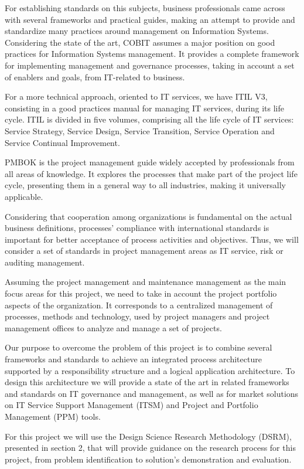 For establishing standards on this subjects, business professionals came across with several frameworks and practical guides, making an attempt to provide and standardize many practices around management on Information Systems. Considering the state of the art, COBIT assumes a major position on good practices for Information Systems management. It provides a complete framework for implementing management and governance processes, taking in account a set of enablers and goals, from IT-related to business.\par
For a more technical approach, oriented to IT services, we have ITIL V3, consisting in a good practices manual for managing IT services, during its life cycle. ITIL is divided in five volumes, comprising all the life cycle of IT services: Service Strategy, Service Design, Service Transition, Service Operation and Service Continual Improvement.\par
PMBOK is the project management guide widely accepted by professionals from all areas of knowledge. It explores the processes that make part of the project life cycle, presenting them in a general way to all industries, making it universally applicable.\par
Considering that cooperation among organizations is fundamental on the actual business definitions, processes' compliance with international standards is important for better acceptance of process activities and objectives. Thus, we will consider a set of standards in project management areas as IT service, risk or auditing management.\par   
Assuming the project management and maintenance management as the main focus areas for this project, we need to take in account the project portfolio aspects of the organization. It corresponds to a centralized management of processes, methods and technology, used by project managers and project management offices to analyze and manage a set of projects.\par
Our purpose to overcome the problem of this project is to combine several frameworks and standards to achieve an integrated process architecture supported by a responsibility structure and a logical application architecture. To design this architecture we will provide a state of the art in related frameworks and standards on IT governance and management, as well as for market solutions on IT Service Support Management (ITSM) and Project and Portfolio Management (PPM) tools.\par
For this project we will use the Design Science Research Methodology (DSRM)\cite{DSRM}, presented in section 2, that will provide guidance on the research process for this project, from problem identification to solution's demonstration and evaluation.\par